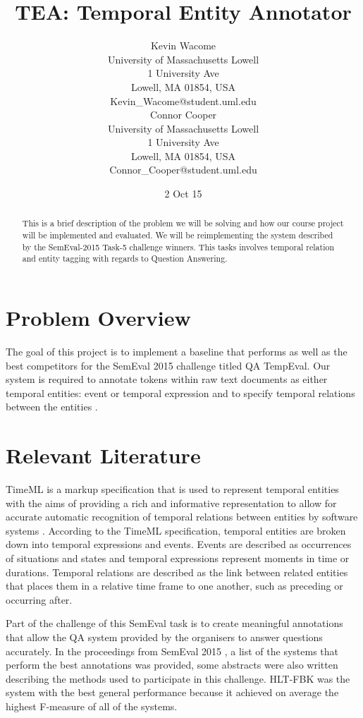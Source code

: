\documentclass[11pt,letterpaper]{article}
\title{TEA: Temporal Entity Annotator}
\author{Kevin Wacome\\
	    University of Massachusetts Lowell\\
	    1 University Ave\\
	    Lowell, MA 01854, USA\\
	    Kevin\_Wacome@student.uml.edu\\
	  \And
		Connor Cooper\\
	  	University of Massachusetts Lowell\\
	  	1 University Ave\\
	  	Lowell, MA 01854, USA\\
		Connor\_Cooper@student.uml.edu\\}
\date{2 Oct 15}
\begin{document}
\maketitle
\begin{abstract}
This is a brief description of the problem we will be solving and how our course project will be implemented and evaluated. We will be reimplementing the system described by the SemEval-2015 Task-5 challenge winners. This tasks involves temporal relation and entity tagging with regards to Question Answering.
\end{abstract}

\section{Problem Overview}

The goal of this project is to implement a baseline that performs as well as the best competitors for the SemEval 2015 challenge titled QA TempEval. Our system is required to annotate tokens within raw text documents as either temporal entities: event or temporal expression and to specify temporal relations between the entities \cite{Llorens:15}.

\section{Relevant Literature}

TimeML is a markup specification that is used to represent temporal entities with the aims of providing a rich and informative representation to allow for accurate automatic recognition of temporal relations between entities by software systems \cite{Pustejovsky:03}. According to the TimeML specification, temporal entities are broken down into temporal expressions and events. Events are described as occurrences of situations and states and temporal expressions represent moments in time or durations. Temporal relations are described as the link between related entities that places them in a relative time frame to one another, such as preceding or occurring after.

Part of the challenge of this SemEval task is to create meaningful annotations that allow the QA system provided by the organisers to answer questions accurately. In the proceedings from SemEval 2015 \cite{Llorens:16}, a list of the systems that perform the best annotations was provided, some abstracts were also written describing the methods used to participate in this challenge. HLT-FBK was the system with the best general performance because it achieved on average the highest F-measure of all of the systems.
\end{document}

